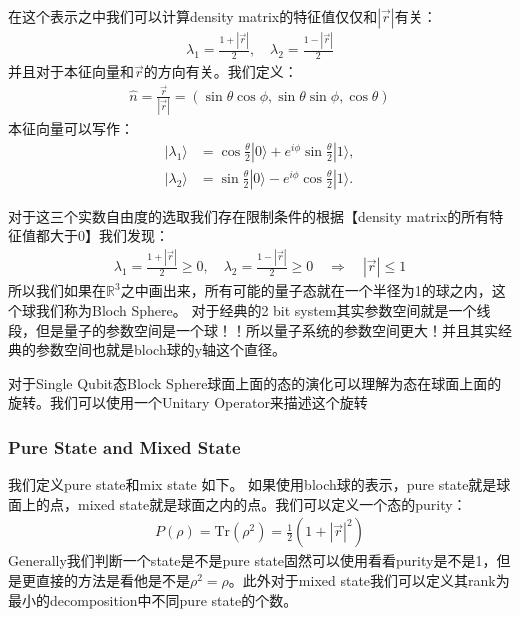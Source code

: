 在这个表示之中我们可以计算density matrix的特征值仅仅和$ |\vec{r}| $有关：
\begin{align}
  \lambda_1 = \frac{1 + |\vec{r}|}{2}, \quad \lambda_2 = \frac{1 - |\vec{r}|}{2}
\end{align}
并且对于本征向量和$ \vec{r} $的方向有关。我们定义：
\begin{align}
  \hat{n}=\frac{\vec{r}}{|\vec{r}|}=(\sin\theta\cos\phi,\sin\theta\sin\phi,\cos\theta)
\end{align}
本征向量可以写作：
\begin{align}
  |\lambda_1\rangle &= \cos\frac{\theta}{2}|0\rangle +
  e^{i\phi}\sin\frac{\theta}{2}|1\rangle, \\
  |\lambda_2\rangle &= \sin\frac{\theta}{2}|0\rangle -
  e^{i\phi}\cos\frac{\theta}{2}|1\rangle.
\end{align}

\bigskip
{}

对于这三个实数自由度的选取我们存在限制条件的根据【density matrix的所有特征值都大于0】我们发现：
\begin{align}
  \lambda_1 = \frac{1 + |\vec{r}|}{2} \geq 0, \quad \lambda_2 =
  \frac{1 - |\vec{r}|}{2} \geq 0 \quad \Rightarrow \quad |\vec{r}| \leq 1
\end{align}
所以我们如果在$ \mathbb{R}^3 $之中画出来，所有可能的量子态就在一个半径为1的球之内，这个球我们称为Bloch Sphere。
对于经典的2 bit
system其实参数空间就是一个线段，但是量子的参数空间是一个球！！所以量子系统的参数空间更大！并且其实经典的参数空间也就是bloch球的y轴这个直径。

\bigskip
{}

对于Single Qubit态Block Sphere球面上面的态的演化可以理解为态在球面上面的旋转。我们可以使用一个Unitary
Operator来描述这个旋转

\subsubsection{Pure State and Mixed State}

\bigskip
{}

我们定义pure state和mix state 如下。
如果使用bloch球的表示，pure state就是球面上的点，mixed state就是球面之内的点。我们可以定义一个态的purity：
\begin{align}
  P(\rho) = \mathrm{Tr}(\rho^2) = \frac{1}{2}(1 + |\vec{r}|^2)
\end{align}
Generally我们判断一个state是不是pure state固然可以使用看看purity是不是1，但是更直接的方法是看他是不是$
\rho^2 = \rho $。此外对于mixed state我们可以定义其rank为最小的decomposition中不同pure state的个数。

